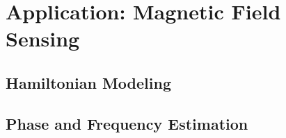 \chapter{Application: Magnetic Field Sensing}
\section{Hamiltonian Modeling}
\section{Phase and Frequency Estimation}
